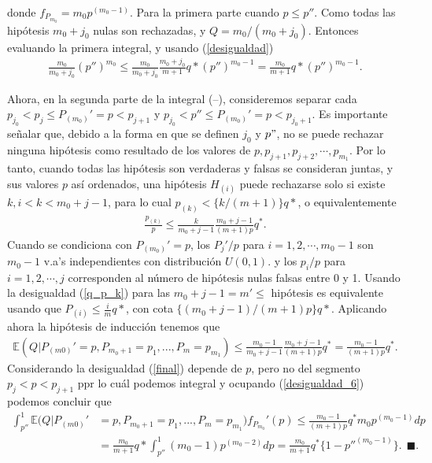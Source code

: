 \documentclass[11pt,letterpaper]{article}
\newcommand{\mE}{\mathbb{E}}
\newcommand{\finf}{\blacksquare.}
\begin{document}
donde $f_{P_{m_0}}=m_0p^{(m_0-1)}.$
Para la primera parte cuando $p\leq p''$. Como todas las hipótesis $m_0+j_0$ nulas son rechazadas, y $Q=m_0/(m_0+j_0)$. Entonces evaluando la primera integral, y usando (\ref{desigualdad})
\begin{align}\label{desigualdad_6}
\frac{m_0}{m_0+j_0}(p'')^{m_0} \leq \frac{m_0}{m_0+j_0} \frac{m_0+j_0}{m+1}q*(p'')^{m_0-1}=\frac{m_0}{m+1}q*(p'')^{m_0-1}.
\end{align}

Ahora, en la segunda parte de la integral (--), consideremos separar cada $p_{j_0}< p_j\leq P_{(m_0)}'=p<p_{j+1}$ y $p_{j_0}< p'' \leq P_{(m_0)}'=p<p_{j_0+1}$.  Es importante señalar que, debido a la forma en que se definen $j_0$ y $p"$, no se puede rechazar ninguna hipótesis como resultado de los valores de $p, p_{j + 1}, p_{j + 2},\cdots, p_{m_1}$. Por lo tanto, cuando todas las hipótesis son verdaderas y falsas se consideran juntas, y sus valores $p$ así ordenados, una hipótesis $H_{(i)}$ puede rechazarse solo si existe $k, i <k<m_0 + j-1$, para lo cual $p_{(k)} <\{k / ( m + 1)\} q *$, o equivalentemente 
\begin{align}\label{q_p_k}
\frac{p_{(k)}}{p}\leq \frac{k}{m_0+j-1} \frac{m_0+j-1}{(m+1)p}q^*.
\end{align}
Cuando se condiciona con $P_{(m_0)}'=p$, los $P_j'/p$ para $i=1,2, \cdots, m_0-1$ son $m_0-1$ v.a's independientes con distribución $U(0,1)$. y los $p_i/p$ para $i=1,2, \cdots,j$ corresponden al número de hipótesis nulas falsas entre 0 y 1. 
Usando la desigualdad (\ref{q_p_k}) para las $m_0+j-1=m'\leq $ hipótesis es equivalente usando que $P_{(i)}\leq \frac{i}{m}q*$, con cota $\{(m_0+j-1)/(m+1)p \}q*$. Aplicando ahora la hipótesis de inducción tenemos que 
\begin{align}\label{final}
\mE (Q | P_{(m0)}'=p, P_{m_0+1}=p_1, ..., P_m = p_{m_1}) \leq \frac{m_0-1}{m_0+j-1} \frac{m_0+j-1}{(m+1)p}q^* = \frac{m_0-1}{(m+1)p}q^*.
\end{align}
Considerando la desigualdad (\ref{final}) depende de $p$, pero no del segmento $p_j<p<p_{j+1}$ ppr lo cuál podemos integral y ocupando (\ref{desigualdad_6}) podemos concluir que 
\begin{align*}
\int_{p''}^1\mE (Q | P_{(m0)}'&=p, P_{m_0+1}=p_1, ..., P_m = p_{m_1})f_{P_{m_0}}'(p) \leq  \frac{m_0-1}{(m+1)p}q^*m_0p^{(m_0-1)}dp\\
&=\frac{m_0}{m+1}q*\int_{p''}^1(m_0-1)p^{(m_0-2)}dp=\frac{m_0}{m+1}q^*\{1-p''^{(m_0-1)} \}. \ \ \finf
\end{align*}
\end{document}
